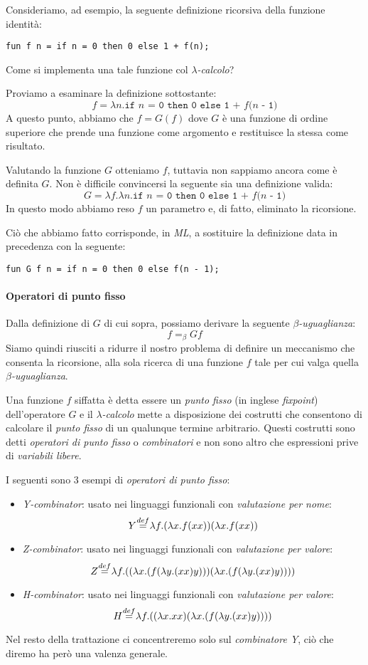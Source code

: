 \documentclass[12pt, a4paper]{report}
\theoremstyle{definition}
\newcommand{\code}[1]{\texttt{#1}}
\newcommand{\beq}{=_\beta}
\newcommand{\mydef}{\stackrel{\mathclap{\normalfont{def}}}{=}}
\begin{document}
Consideriamo, ad esempio, la seguente definizione ricorsiva della funzione
identità:
\begin{lstlisting}
fun f n = if n = 0 then 0 else 1 + f(n);
\end{lstlisting}
Come si implementa una tale funzione col \emph{$\lambda$-calcolo}?

Proviamo a esaminare la definizione sottostante:
\[f=\lambda n.\code{if $n$ = 0 then 0 else 1 + $f$($n$ - 1)}\]
A questo punto, abbiamo che \(f=G(f)\) dove $G$ è una funzione di ordine superiore
che prende una funzione come argomento e restituisce la stessa come risultato.

Valutando la funzione $G$ otteniamo $f$, tuttavia non sappiamo ancora come è
definita $G$. Non è difficile convincersi la seguente sia una definizione valida:
\[G=\lambda f.\lambda n.\code{if $n$ = 0 then 0 else 1 + $f$($n$ - 1)}\]
In questo modo abbiamo reso $f$ un parametro e, di fatto, eliminato la ricorsione.

Ciò che abbiamo fatto corrisponde, in \emph{ML}, a sostituire la definizione data
in precedenza con la seguente:
\begin{lstlisting}
fun G f n = if n = 0 then 0 else f(n - 1);
\end{lstlisting}

\paragraph*{Operatori di punto fisso}
Dalla definizione di $G$ di cui sopra, possiamo derivare la seguente
\emph{$\beta$-uguaglianza}:
\[f\beq Gf\]
Siamo quindi riusciti a ridurre il nostro problema di definire un meccanismo che
consenta la ricorsione, alla sola ricerca di una funzione $f$ tale per cui valga
quella \emph{$\beta$-uguaglianza}.

Una funzione $f$ siffatta è detta essere un \emph{punto fisso} (in inglese
\emph{fixpoint}) dell'operatore $G$ e il \emph{$\lambda$-calcolo} mette a disposizione
dei costrutti che consentono di calcolare il \emph{punto fisso} di un qualunque
termine arbitrario. Questi costrutti sono detti \emph{operatori di punto fisso}
o \emph{combinatori} e non sono altro che espressioni prive di \emph{variabili
libere}.

I seguenti sono 3 esempi di \emph{operatori di punto fisso}:
\begin{itemize}
    \item \emph{Y-combinator}: usato nei linguaggi funzionali con \emph{valutazione
    per nome}:
    \[Y\mydef\lambda f.(\lambda x.f(xx))(\lambda x.f(xx))\]
    \item \emph{Z-combinator}: usato nei linguaggi funzionali con \emph{valutazione
    per valore}:
    \[Z\mydef\lambda f.((\lambda x.(f(\lambda y.(xx)y)))(\lambda x.(f(\lambda y.(xx)y))))\]
    \item \emph{H-combinator}: usato nei linguaggi funzionali con \emph{valutazione
    per valore}:
    \[H\mydef\lambda f.((\lambda x.xx)(\lambda x.(f(\lambda y.(xx)y))))\]
\end{itemize}
Nel resto della trattazione ci concentreremo solo sul \emph{combinatore Y}, ciò
che diremo ha però una valenza generale.
\end{document}
